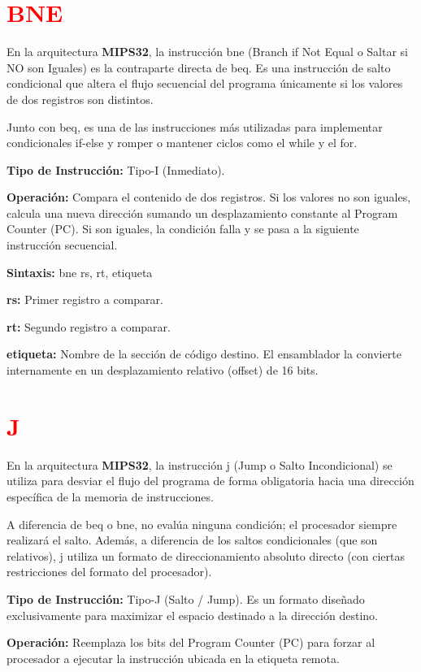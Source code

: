 \documentclass[12pt,a4paper]{article}
\begin{document}
\section{\textcolor{red}{BNE}}

En la arquitectura \textbf{MIPS32}, la instrucción bne (Branch if Not Equal o Saltar si NO son Iguales) es la contraparte directa de beq. Es una instrucción de salto condicional que altera el flujo secuencial del programa únicamente si los valores de dos registros son distintos.

Junto con beq, es una de las instrucciones más utilizadas para implementar condicionales if-else y romper o mantener ciclos como el while y el for.

\textbf{Tipo de Instrucción:} Tipo-I (Inmediato).

\textbf{Operación:} Compara el contenido de dos registros. Si los valores no son iguales, calcula una nueva dirección sumando un desplazamiento constante al Program Counter (PC). Si son iguales, la condición falla y se pasa a la siguiente instrucción secuencial.

\textbf{Sintaxis:} bne rs, rt, etiqueta

\textbf{rs:} Primer registro a comparar.

\textbf{rt:} Segundo registro a comparar.

\textbf{etiqueta:} Nombre de la sección de código destino. El ensamblador la convierte internamente en un desplazamiento relativo (offset) de 16 bits.

\section{\textcolor{red}{J}}
En la arquitectura \textbf{MIPS32}, la instrucción j (Jump o Salto Incondicional) se utiliza para desviar el flujo del programa de forma obligatoria hacia una dirección específica de la memoria de instrucciones.

A diferencia de beq o bne, no evalúa ninguna condición; el procesador siempre realizará el salto. Además, a diferencia de los saltos condicionales (que son relativos), j utiliza un formato de direccionamiento absoluto directo (con ciertas restricciones del formato del procesador).

\textbf{Tipo de Instrucción:} Tipo-J (Salto / Jump). Es un formato diseñado exclusivamente para maximizar el espacio destinado a la dirección destino.

\textbf{Operación:} Reemplaza los bits del Program Counter (PC) para forzar al procesador a ejecutar la instrucción ubicada en la etiqueta remota.
\end{document}
